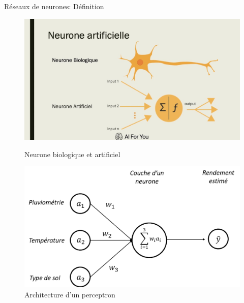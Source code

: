 \documentclass{beamer}
\begin{document}
\begin{frame}{Réseaux de neurones: Définition}
	\begin{figure}[h]
		\centering
		\begin{minipage}{0.5\textwidth}
			\centering
			\includegraphics[width=\linewidth]{rnbio.jpg}
			\caption{Neurone biologique et artificiel}
		\end{minipage}\hfill
		\begin{minipage}{0.5\textwidth}
			\centering
			\includegraphics[width=\linewidth]{Architecture-perceptron.png}
			\caption{Architecture d'un perceptron }
		\end{minipage}
	\end{figure}
\end{frame}	
\end{document}
